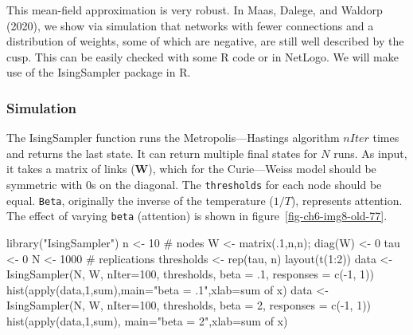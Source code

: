 \documentclass[
  a4paper,
  DIV=11,
  numbers=noendperiod,
  oneside]{scrreprt}
\newenvironment{Shaded}{}{}
\newcommand{\AttributeTok}[1]{\textcolor[rgb]{0.84,0.23,0.29}{#1}}
\newcommand{\CommentTok}[1]{\textcolor[rgb]{0.42,0.45,0.49}{#1}}
\newcommand{\DecValTok}[1]{\textcolor[rgb]{0.00,0.36,0.77}{#1}}
\newcommand{\FunctionTok}[1]{\textcolor[rgb]{0.44,0.26,0.76}{#1}}
\newcommand{\NormalTok}[1]{\textcolor[rgb]{0.14,0.16,0.18}{#1}}
\newcommand{\OtherTok}[1]{\textcolor[rgb]{0.44,0.26,0.76}{#1}}
\newcommand{\SpecialCharTok}[1]{\textcolor[rgb]{0.00,0.36,0.77}{#1}}
\newcommand{\StringTok}[1]{\textcolor[rgb]{0.01,0.18,0.38}{#1}}
\begin{document}
This mean-field approximation is very robust. In Maas, Dalege, and
Waldorp (2020), we show via simulation that networks with fewer
connections and a distribution of weights, some of which are negative,
are still well described by the cusp. This can be easily checked with
some R code or in NetLogo. We will make use of the IsingSampler package
in R.

\subsubsection{Simulation}\label{sec-Simulation}

The IsingSampler function runs the Metropolis---Hastings algorithm
\(nIter\) times and returns the last state. It can return multiple final
states for \(N\) runs. As input, it takes a matrix of links
(\(\mathbf{W}\)), which for the Curie---Weiss model should be symmetric
with 0s on the diagonal. The \texttt{thresholds} for each node should be
equal. \texttt{Beta}, originally the inverse of the temperature
(\(1/T\)), represents attention. The effect of varying \texttt{beta}
(attention) is shown in figure~\ref{fig-ch6-img8-old-77}.

\begin{Shaded}
\begin{Highlighting}[]
\FunctionTok{library}\NormalTok{(}\StringTok{"IsingSampler"}\NormalTok{)}
\NormalTok{n }\OtherTok{\textless{}{-}} \DecValTok{10} \CommentTok{\# nodes}
\NormalTok{W }\OtherTok{\textless{}{-}} \FunctionTok{matrix}\NormalTok{(.}\DecValTok{1}\NormalTok{,n,n); }\FunctionTok{diag}\NormalTok{(W) }\OtherTok{\textless{}{-}} \DecValTok{0}
\NormalTok{tau }\OtherTok{\textless{}{-}} \DecValTok{0}
\NormalTok{N }\OtherTok{\textless{}{-}} \DecValTok{1000} \CommentTok{\# replications}
\NormalTok{thresholds }\OtherTok{\textless{}{-}} \FunctionTok{rep}\NormalTok{(tau, n)}
\FunctionTok{layout}\NormalTok{(}\FunctionTok{t}\NormalTok{(}\DecValTok{1}\SpecialCharTok{:}\DecValTok{2}\NormalTok{))}
\NormalTok{data }\OtherTok{\textless{}{-}} \FunctionTok{IsingSampler}\NormalTok{(N, W, }\AttributeTok{nIter=}\DecValTok{100}\NormalTok{, thresholds, }
            \AttributeTok{beta =}\NormalTok{ .}\DecValTok{1}\NormalTok{, }\AttributeTok{responses =} \FunctionTok{c}\NormalTok{(}\SpecialCharTok{{-}}\DecValTok{1}\NormalTok{, }\DecValTok{1}\NormalTok{))}
\FunctionTok{hist}\NormalTok{(}\FunctionTok{apply}\NormalTok{(data,}\DecValTok{1}\NormalTok{,sum),}\AttributeTok{main=}\StringTok{"beta = .1"}\NormalTok{,}\AttributeTok{xlab=}\StringTok{\textquotesingle{}sum of x\textquotesingle{}}\NormalTok{)}
\NormalTok{data }\OtherTok{\textless{}{-}} \FunctionTok{IsingSampler}\NormalTok{(N, W, }\AttributeTok{nIter=}\DecValTok{100}\NormalTok{, thresholds, }
            \AttributeTok{beta =} \DecValTok{2}\NormalTok{, }\AttributeTok{responses =} \FunctionTok{c}\NormalTok{(}\SpecialCharTok{{-}}\DecValTok{1}\NormalTok{, }\DecValTok{1}\NormalTok{))}
\FunctionTok{hist}\NormalTok{(}\FunctionTok{apply}\NormalTok{(data,}\DecValTok{1}\NormalTok{,sum), }\AttributeTok{main=}\StringTok{"beta = 2"}\NormalTok{,}\AttributeTok{xlab=}\StringTok{\textquotesingle{}sum of x\textquotesingle{}}\NormalTok{)}
\end{Highlighting}
\end{Shaded}
\end{document}
